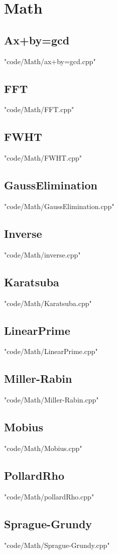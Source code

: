 \documentclass[landscape, 8pt,twocolumn,oneside, a4paper]{article}
\begin{document}
\section{Math}
\subsection{Ax+by=gcd}
 {"code/Math/ax+by=gcd.cpp"}
\subsection{FFT}
 {"code/Math/FFT.cpp"}
\subsection{FWHT}
 {"code/Math/FWHT.cpp"}
\subsection{GaussElimination}
 {"code/Math/GaussElimination.cpp"}
\subsection{Inverse}
 {"code/Math/inverse.cpp"}
\subsection{Karatsuba}
 {"code/Math/Karatsuba.cpp"}
\subsection{LinearPrime}
 {"code/Math/LinearPrime.cpp"}
\subsection{Miller-Rabin}
 {"code/Math/Miller-Rabin.cpp"}
\subsection{Mobius}
 {"code/Math/Mobius.cpp"}
\subsection{PollardRho}
 {"code/Math/pollardRho.cpp"}
\subsection{Sprague-Grundy}
 {"code/Math/Sprague-Grundy.cpp"}
\end{document}
